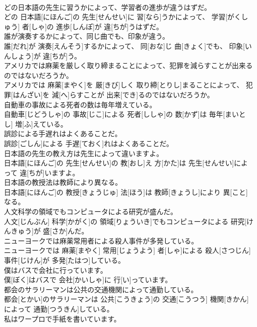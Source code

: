 \documentclass[8pt]{extreport}
\begin{document}
\begin{CJK}{UTF8}{min}
\\	どの日本語の先生に習うかによって、学習者の進歩が違うはずだ。	
\\	どの 日本語[にほんご]の 先生[せんせい]に 習[なら]うかによって、 学習[がくしゅう] 者[しゃ]の 進歩[しんぽ]が 違[ちが]うはずだ。
\\	誰が演奏するかによって、同じ曲でも、印象が違う。	
\\	誰[だれ]が 演奏[えんそう]するかによって、 同[おな]じ 曲[きょく]でも、 印象[いんしょう]が 違[ちが]う。
\\	アメリカでは麻薬を厳しく取り締まることによって、犯罪を減らすことが出来るのではないだろうか。	
\\	アメリカでは 麻薬[まやく]を 厳[きび]しく 取り締[とりし]まることによって、 犯罪[はんざい]を 減[へ]らすことが 出来[でき]るのではないだろうか。
\\	自動車の事故による死者の数は毎年増えている。	
\\	自動車[じどうしゃ]の 事故[じこ]による 死者[ししゃ]の 数[かず]は 毎年[まいとし] 増[ふ]えている。
\\	誤診による手遅れはよくあることだ。	
\\	誤診[ごしん]による 手遅[ておく]れはよくあることだ。
\\	日本語の先生の教え方は先生によって違いますよ。	
\\	日本語[にほんご]の 先生[せんせい]の 教[おし]え 方[かた]は 先生[せんせい]によって 違[ちが]いますよ。
\\	日本語の教授法は教師により異なる。	
\\	日本語[にほんご]の 教授[きょうじゅ] 法[ほう]は 教師[きょうし]により 異[こと]なる。
\\	人文科学の領域でもコンピュータによる研究が盛んだ。	
\\	人文[じんぶん] 科学[かがく]の 領域[りょういき]でもコンピュータによる 研究[けんきゅう]が 盛[さか]んだ。
\\	ニューヨークでは麻薬常用者による殺人事件が多発している。	
\\	ニューヨークでは 麻薬[まやく] 常用[じょうよう] 者[しゃ]による 殺人[さつじん] 事件[じけん]が 多発[たはつ]している。
\\	僕はバスで会社に行っています。	
\\	僕[ぼく]はバスで 会社[かいしゃ]に 行[い]っています。
\\	都会のサラリーマンは公共の交通機関によって通勤している。	
\\	都会[とかい]のサラリーマンは 公共[こうきょう]の 交通[こうつう] 機関[きかん]によって 通勤[つうきん]している。
\\	私はワープロで手紙を書いています。	

\end{CJK}
\end{document}
